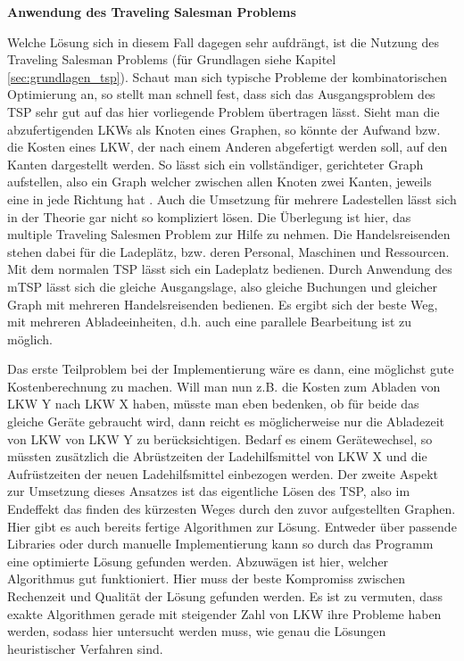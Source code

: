 \textbf{Anwendung des Traveling Salesman Problems}

Welche Lösung sich in diesem Fall dagegen sehr aufdrängt, ist die Nutzung des Traveling Salesman Problems (für Grundlagen siehe Kapitel \ref{sec:grundlagen_tsp}). Schaut man sich typische Probleme der kombinatorischen Optimierung an, so stellt man schnell fest, dass sich das Ausgangsproblem des TSP sehr gut auf das hier vorliegende Problem übertragen lässt. Sieht man die abzufertigenden LKWs als Knoten eines Graphen, so könnte der Aufwand bzw. die Kosten eines LKW, der nach einem Anderen abgefertigt werden soll, auf den Kanten dargestellt werden. So lässt sich ein vollständiger, gerichteter Graph aufstellen, also ein Graph welcher zwischen allen Knoten zwei Kanten, jeweils eine in jede Richtung hat \cite{graphenEckenKanten}. Auch die Umsetzung für mehrere Ladestellen lässt sich in der Theorie gar nicht so kompliziert lösen. Die Überlegung ist hier, das multiple Traveling Salesmen Problem zur Hilfe zu nehmen. Die Handelsreisenden stehen dabei für die Ladeplätz, bzw. deren Personal, Maschinen und Ressourcen. Mit dem normalen TSP lässt sich ein Ladeplatz bedienen. Durch Anwendung des mTSP lässt sich die gleiche Ausgangslage, also gleiche Buchungen und gleicher Graph mit mehreren Handelsreisenden bedienen. Es ergibt sich der beste Weg, mit mehreren Abladeeinheiten, d.h. auch eine parallele Bearbeitung ist zu möglich.

Das erste Teilproblem bei der Implementierung wäre es dann, eine möglichst gute Kostenberechnung zu machen. Will man nun z.B. die Kosten zum Abladen von LKW Y nach LKW X haben, müsste man eben bedenken, ob für beide das gleiche Geräte gebraucht wird, dann reicht es möglicherweise nur die Abladezeit von LKW von LKW Y zu berücksichtigen. Bedarf es einem Gerätewechsel, so müssten zusätzlich die Abrüstzeiten der Ladehilfsmittel von LKW X und die Aufrüstzeiten der neuen Ladehilfsmittel einbezogen werden. Der zweite Aspekt zur Umsetzung dieses Ansatzes ist das eigentliche Lösen des TSP, also im Endeffekt das finden des kürzesten Weges durch den zuvor aufgestellten Graphen. Hier gibt es auch bereits fertige Algorithmen zur Lösung. Entweder über passende Libraries oder durch manuelle Implementierung kann so durch das Programm eine optimierte Lösung gefunden werden. Abzuwägen ist hier, welcher Algorithmus gut funktioniert. Hier muss der beste Kompromiss zwischen Rechenzeit und Qualität der Lösung gefunden werden. Es ist zu vermuten, dass exakte Algorithmen gerade mit steigender Zahl von LKW ihre Probleme haben werden, sodass hier untersucht werden muss, wie genau die Lösungen heuristischer Verfahren sind.


